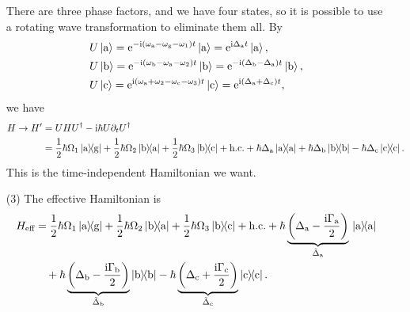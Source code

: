 \documentclass[hyperref, a4paper]{article}
\newcommand*{\ii}{\mathrm{i}}
\newcommand*{\ee}{\mathrm{e}}
\begin{document}
\begin{itemize}
There are three phase factors, and we have four states, so it is possible to use a rotating wave transformation to 
eliminate them all. By  
\begin{equation}
    \begin{aligned}
        &U \ket*{\text{a}} = \ee^{- \ii (\omega_\text{a} - \omega_\text{g} - \omega_1) t} \ket*{\text{a}} = \ee^{ \ii \Delta_\text{a} t} \ket*{\text{a}}  , \\
        &U \ket*{\text{b}} = \ee^{- \ii (\omega_\text{b} - \omega_\text{a} - \omega_2 ) t} \ket*{\text{b}} = \ee^{- \ii (\Delta_\text{b} - \Delta_\text{a}) t} \ket*{\text{b}}, \\
        &U \ket*{\text{c}} = \ee^{\ii (\omega_\text{a} + \omega_2 - \omega_\text{c} - \omega_3) t} \ket*{\text{c}} = \ee^{\ii (\Delta_\text{a} + \Delta_\text{c}) t},
    \end{aligned}
\end{equation}
we have 
\begin{equation}
    \begin{aligned}
        H \to H' &= U H U^\dagger - \ii \hbar U \partial_t U^\dagger \\
        &= \frac{1}{2} \hbar \Omega_1 \dyad*{\text{a}}{\text{g}} + \frac{1}{2} \hbar \Omega_2 \dyad*{\text{b}}{\text{a}} + \frac{1}{2} \hbar \Omega_3  \dyad*{\text{b}}{\text{c}} + \text{h.c.} + \hbar \Delta_\text{a} \dyad*{\text{a}} + \hbar \Delta_\text{b} \dyad{\text{b}} - \hbar \Delta_\text{c} \dyad{\text{c}}.
    \end{aligned}
\end{equation}
This is the time-independent Hamiltonian we want.
\item[(3)] The effective Hamiltonian is 
\begin{equation}
    \begin{aligned}
        H_\text{eff}& = \frac{1}{2} \hbar \Omega_1 \dyad*{\text{a}}{\text{g}} + \frac{1}{2} \hbar \Omega_2 \dyad*{\text{b}}{\text{a}} + \frac{1}{2} \hbar \Omega_3  \dyad*{\text{b}}{\text{c}} + \text{h.c.} + \hbar \underbrace{\left( \Delta_\text{a} - \frac{\ii \Gamma_\text{a}}{2} \right)}_{\tilde{\Delta}_\text{a}} \dyad*{\text{a}} \\
        &\quad + \hbar \underbrace{\left( \Delta_\text{b} - \frac{\ii \Gamma_\text{b}}{2} \right)}_{\tilde{\Delta}_\text{b}} \dyad{\text{b}} - \hbar \underbrace{\left( \Delta_\text{c} + \frac{\ii \Gamma_\text{c}}{2} \right)}_{\tilde{\Delta}_\text{c}} \dyad{\text{c}} .
    \end{aligned}
\end{equation} 


\end{itemize}
\end{document}
